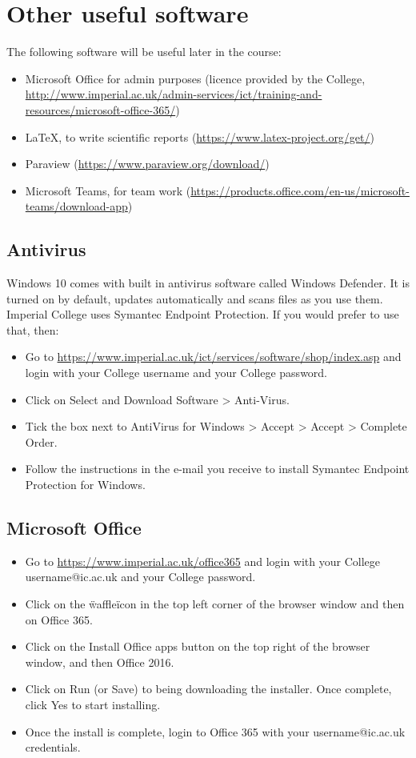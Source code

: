 \documentclass[11pt]{article}
\begin{document}
\section{Other useful software}

The following software will be useful later in the course:
\begin{itemize}
  \item Microsoft Office for admin purposes (licence provided by the College, \url{http://www.imperial.ac.uk/admin-services/ict/training-and-resources/microsoft-office-365/})
  \item LaTeX, to write scientific reports (\url{https://www.latex-project.org/get/})
  \item Paraview (\url{https://www.paraview.org/download/})
  \item Microsoft Teams, for team work (\url{https://products.office.com/en-us/microsoft-teams/download-app})
\end{itemize}


\subsection{Antivirus}
Windows 10 comes with built in antivirus software called Windows Defender. It is turned on by default, updates automatically and scans files as you use them. 
Imperial College uses Symantec Endpoint Protection. If you would prefer to use that, then:
\begin{itemize}
  \item Go to \url{https://www.imperial.ac.uk/ict/services/software/shop/index.asp} and login with your College username and your College password.
  \item Click on Select and Download Software > Anti-Virus.
  \item Tick the box next to AntiVirus for Windows > Accept > Accept > Complete Order.
  \item Follow the instructions in the e-mail you receive to install Symantec Endpoint Protection for Windows. 
\end{itemize}

\subsection{Microsoft Office}
\begin{itemize}
  \item Go to \url{https://www.imperial.ac.uk/office365} and login with your College username@ic.ac.uk and your College password.
  \item Click on the \"waffle\" icon in the top left corner of the browser window and then on Office 365.
  \item Click on the Install Office apps button on the top right of the browser window, and then Office 2016.
  \item Click on Run (or Save) to being downloading the installer. Once complete, click Yes to start installing.
  \item Once the install is complete, login to Office 365 with your username@ic.ac.uk credentials.
\end{itemize}
\end{document}
